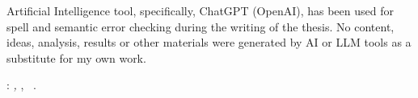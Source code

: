 \clearpage
{}
\thispagestyle{empty}


\hfill
\vfill

Artificial Intelligence tool, specifically, ChatGPT (OpenAI), has been used for spell and semantic error checking during the writing of the thesis. No content, ideas, analysis, results or other materials were generated by AI or LLM tools as a substitute for my own work.
\vspace{20pt}

\noindent\myName: \textit{\myTitle,}
\myDegree,
\textcopyright\ \myTime.

